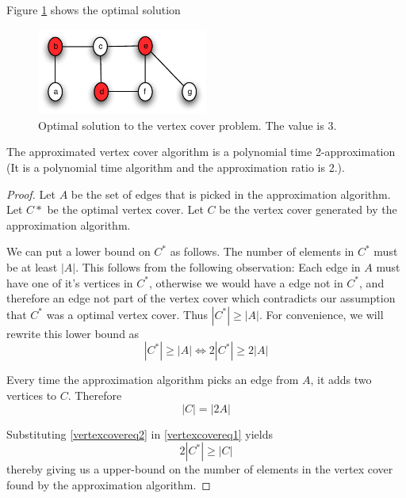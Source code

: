 \documentclass[10pt]{article}
\begin{document}
Figure \ref{fig13} shows the optimal solution
\begin{figure}[ht]
\centering
\includegraphics[width=0.5\textwidth]{figures/fig13.pdf}
\caption{Optimal solution to the vertex cover problem. The value is 3.}
\label{fig13}
\end{figure}

The approximated vertex cover algorithm is a polynomial time 2-approximation (It is a polynomial time algorithm and the approximation ratio is 2.).

\begin{proof}
Let $A$ be the set of edges that is picked in the approximation algorithm. Let $C*$ be the optimal vertex cover. Let $C$ be the vertex cover generated by the approximation algorithm. 

We can put a lower bound on $C^*$ as follows. The number of elements in $C^*$ must be at least $|A|$. This follows from the following observation: Each edge in $A$ must have one of it's vertices in $C^*$, otherwise we would have a edge not in $C^*$, and therefore an edge not part of the vertex cover which contradicts our assumption that $C^*$ was a optimal vertex cover. Thus $|C^*| \geq |A|$. For convenience, we will rewrite this lower bound as 
\begin{equation}
|C^*| \geq |A| \Leftrightarrow 2|C^*| \geq 2|A|  \label{vertexcovereq1}
\end{equation}

Every time the approximation algorithm picks an edge from $A$, it adds two vertices to $C$. Therefore 
\begin{equation}
|C| = |2A| \label{vertexcovereq2}   
\end{equation}

Substituting \ref{vertexcovereq2} in \ref{vertexcovereq1} yields
\begin{equation}
2|C^*| \geq |C|
\end{equation}
thereby giving us a upper-bound on the number of elements in the vertex cover found by the approximation algorithm.
\end{proof}

\end{document}
